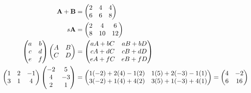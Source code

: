 \documentclass[
]{article}
\begin{document}
\begin{answer}
\begin{align*}
{\bf A+B} &= \begin{pmatrix} 2 & 4 & 4 \\ 6 & 6 & 8 \end{pmatrix} \\
s {\bf A} &= \begin{pmatrix} 2 & 4 & 6 \\ 8 & 10 & 12 \end{pmatrix} \\
\begin{pmatrix} a&b\\c&d\\e&f \end{pmatrix} \begin{pmatrix} A&B\\C&D \end{pmatrix}   &= \begin{pmatrix} aA+bC&aB+bD\\cA+dC&cB+dD\\eA+fC&eB+fD \end{pmatrix} \\
\begin{pmatrix} 1&2&-1\\3&1&4 \end{pmatrix} \begin{pmatrix} -2&5\\4&-3\\2&1\end{pmatrix} &=
\begin{pmatrix} 1(-2)+2(4)-1(2)&1(5)+2(-3)-1(1)\\
3(-2)+1(4)+4(2)&3(5)+1(-3)+4(1)\end{pmatrix} =
\begin{pmatrix} 4&-2\\6&16\end{pmatrix}
\end{align*}
\end{answer}
\end{document}
